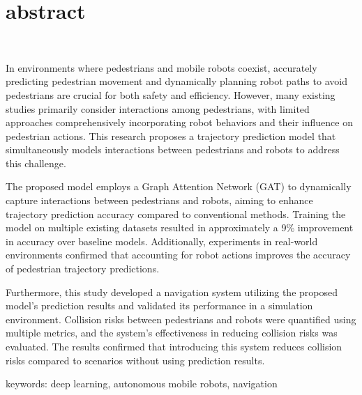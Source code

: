\chapter*{abstract}
\thispagestyle{empty}
%
\vspace{-30pt}
\begin{center}
  \scalebox{1.2}{Pedestrian Position Prediction Using Deep Learning for Mobile Robot}\\
  \scalebox{1.2}{and Its Application to Navigation}
\end{center}
\vspace{1.0zh}
%
In environments where pedestrians and mobile robots coexist, accurately predicting pedestrian movement and dynamically planning robot paths to avoid pedestrians are crucial for both safety and efficiency. However, many existing studies primarily consider interactions among pedestrians, with limited approaches comprehensively incorporating robot behaviors and their influence on pedestrian actions. This research proposes a trajectory prediction model that simultaneously models interactions between pedestrians and robots to address this challenge.

The proposed model employs a Graph Attention Network (GAT) to dynamically capture interactions between pedestrians and robots, aiming to enhance trajectory prediction accuracy compared to conventional methods. Training the model on multiple existing datasets resulted in approximately a 9\% improvement in accuracy over baseline models. Additionally, experiments in real-world environments confirmed that accounting for robot actions improves the accuracy of pedestrian trajectory predictions.

Furthermore, this study developed a navigation system utilizing the proposed model's prediction results and validated its performance in a simulation environment. Collision risks between pedestrians and robots were quantified using multiple metrics, and the system’s effectiveness in reducing collision risks was evaluated. The results confirmed that introducing this system reduces collision risks compared to scenarios without using prediction results.

\begin{flushleft}
keywords: deep learning, autonomous mobile robots, navigation
\end{flushleft}